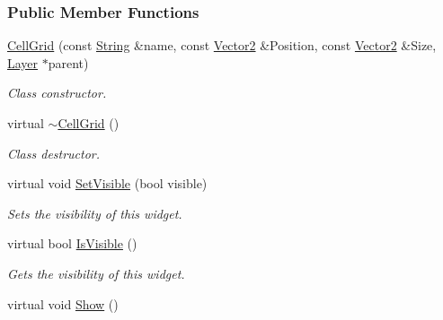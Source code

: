 \subsubsection*{Public Member Functions}
\begin{DoxyCompactItemize}
\item 
\hyperlink{classphys_1_1UI_1_1CellGrid_ace71a7178cd85b2c322403d59aec8e4f}{CellGrid} (const \hyperlink{namespacephys_aa03900411993de7fbfec4789bc1d392e}{String} \&name, const \hyperlink{classphys_1_1Vector2}{Vector2} \&Position, const \hyperlink{classphys_1_1Vector2}{Vector2} \&Size, \hyperlink{classphys_1_1UI_1_1Layer}{Layer} $\ast$parent)
\begin{DoxyCompactList}\small\item\em Class constructor. \item\end{DoxyCompactList}\item 
\hypertarget{classphys_1_1UI_1_1CellGrid_ac1abc38620bbb790afb01443cb2d6853}{
virtual \hyperlink{classphys_1_1UI_1_1CellGrid_ac1abc38620bbb790afb01443cb2d6853}{$\sim$CellGrid} ()}
\label{d8/d59/classphys_1_1UI_1_1CellGrid_ac1abc38620bbb790afb01443cb2d6853}

\begin{DoxyCompactList}\small\item\em Class destructor. \item\end{DoxyCompactList}\item 
virtual void \hyperlink{classphys_1_1UI_1_1CellGrid_abd1b3b422680a8b549c1c897b300da5d}{SetVisible} (bool visible)
\begin{DoxyCompactList}\small\item\em Sets the visibility of this widget. \item\end{DoxyCompactList}\item 
virtual bool \hyperlink{classphys_1_1UI_1_1CellGrid_af53601ab18e77237550c3eb97043e68c}{IsVisible} ()
\begin{DoxyCompactList}\small\item\em Gets the visibility of this widget. \item\end{DoxyCompactList}\item 
\hypertarget{classphys_1_1UI_1_1CellGrid_a772ea260724d009cfe6241e8dac5585b}{
virtual void \hyperlink{classphys_1_1UI_1_1CellGrid_a772ea260724d009cfe6241e8dac5585b}{Show} ()}
\label{d8/d59/classphys_1_1UI_1_1CellGrid_a772ea260724d009cfe6241e8dac5585b}


\end{DoxyCompactItemize}
